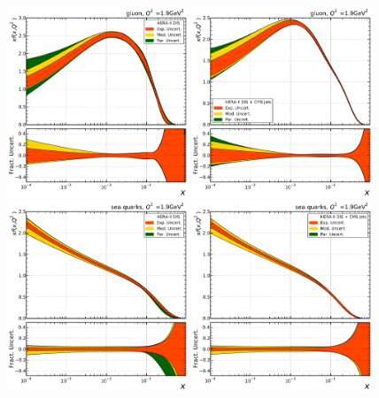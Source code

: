 \begin{figure}[tbp]
  \centering
  \includegraphics[width=0.48\textwidth]{figures/pdf_constraints/split_hera/HFTD_HERA_V017_EIG_0_1_9.pdf}\hfill%
  \includegraphics[width=0.48\textwidth]{figures/pdf_constraints/split_heracms/HFTD_HERACMSTDJETS_V017_EIG_0_1_9.pdf}
  \includegraphics[width=0.48\textwidth]{figures/pdf_constraints/split_hera/HFTD_HERA_V017_EIG_9_1_9.pdf}\hfill%
  \includegraphics[width=0.48\textwidth]{figures/pdf_constraints/split_heracms/HFTD_HERACMSTDJETS_V017_EIG_9_1_9.pdf}
  \caption{}
  \label{fig:pdfconstraints:split:gluonqsea:19}
\end{figure}

